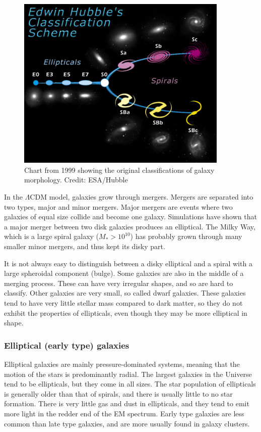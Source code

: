 \begin{figure}
    \centering
    \includegraphics[width=0.9\textwidth]{images/hubble.jpg}
    \caption{Chart from 1999 showing the original classifications of galaxy morphology. Credit: ESA/Hubble}
    \label{hubble}
\end{figure}

In the $\Lambda$CDM model, galaxies grow through mergers. Mergers are separated into two types, major and minor mergers.  Major mergers are events where two galaxies of equal size collide and become one galaxy. Simulations have shown that a major merger between two disk galaxies produces an elliptical. The Milky Way, which is a large spiral galaxy ($M_*>10^{10}$) has probably grown through many smaller minor mergers, and thus kept its disky part.

It is not always easy to distinguish between a disky elliptical and a spiral with a large spheroidal component (bulge). Some galaxies are also in the middle of a merging process. These can have very irregular shapes, and so are hard to classify. Other galaxies are very small, so called dwarf galaxies. These galaxies tend to have very little stellar mass compared to dark matter, so they do not exhibit the properties of ellipticals, even though they may be more elliptical in shape.

\subsubsection{Elliptical (early type) galaxies}
Elliptical galaxies are mainly pressure-dominated systems, meaning that the motion of the stars is predominantly radial. The largest galaxies in the Universe tend to be ellipticals, but they come in all sizes. The star population of ellipticals is generally older than that of spirals, and there is usually little to no star formation. There is very little gas and dust in ellipticals, and they tend to emit more light in the redder end of the EM spectrum. Early type galaxies are less common than late type galaxies, and are more usually found in galaxy clusters.

